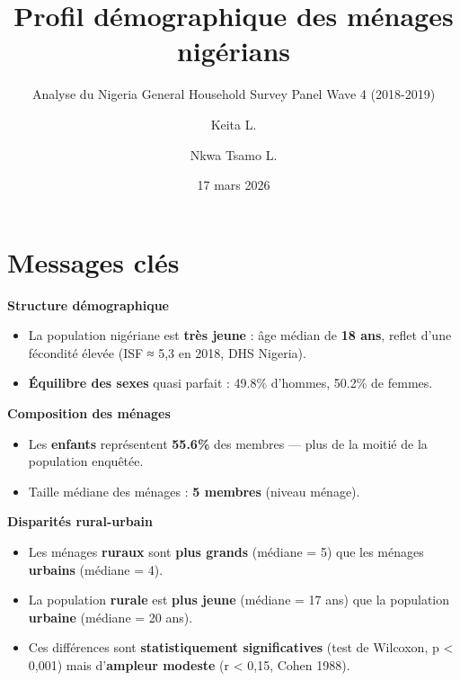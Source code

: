 \documentclass[
  10pt,
]{article}
\title{Profil démographique des ménages nigérians}
\subtitle{Analyse du Nigeria General Household Survey Panel Wave 4
(2018-2019)}
\author{Keita L. \and Nkwa Tsamo L.}
\date{17 mars 2026}
\renewcommand*\contentsname{Table des matières}
\newcommand\contentsname{Table des matières}
\begin{document}
\maketitle


\newpage

\renewcommand*\contentsname{Table des matières}
{
\hypersetup{linkcolor=}
\setcounter{tocdepth}{3}
\tableofcontents
}

\newpage{}

\section*{Messages clés}\label{messages-cluxe9s}

\begin{tcolorbox}[enhanced jigsaw, breakable, bottomrule=.15mm, colbacktitle=quarto-callout-note-color!10!white, colback=white, titlerule=0mm, bottomtitle=1mm, toptitle=1mm, opacitybacktitle=0.6, arc=.35mm, opacityback=0, left=2mm, colframe=quarto-callout-note-color-frame, rightrule=.15mm, title={Principaux résultats}, toprule=.15mm, coltitle=black, leftrule=.75mm]

\textbf{Structure démographique}

\begin{itemize}
\item
  La population nigériane est \textbf{très jeune} : âge médian de
  \textbf{18 ans}, reflet d'une fécondité élevée (ISF ≈ 5,3 en 2018, DHS
  Nigeria).
\item
  \textbf{Équilibre des sexes} quasi parfait : 49.8\% d'hommes, 50.2\%
  de femmes.
\end{itemize}

\textbf{Composition des ménages}

\begin{itemize}
\item
  Les \textbf{enfants} représentent \textbf{55.6\%} des membres --- plus
  de la moitié de la population enquêtée.
\item
  Taille médiane des ménages : \textbf{5 membres} (niveau ménage).
\end{itemize}

\textbf{Disparités rural-urbain}

\begin{itemize}
\item
  Les ménages \textbf{ruraux} sont \textbf{plus grands} (médiane = 5)
  que les ménages \textbf{urbains} (médiane = 4).
\item
  La population \textbf{rurale} est \textbf{plus jeune} (médiane = 17
  ans) que la population \textbf{urbaine} (médiane = 20 ans).
\item
  Ces différences sont \textbf{statistiquement significatives} (test de
  Wilcoxon, p \textless{} 0,001) mais d'\textbf{ampleur modeste} (r
  \textless{} 0,15, Cohen 1988).
\end{itemize}


\end{tcolorbox}
\end{document}

